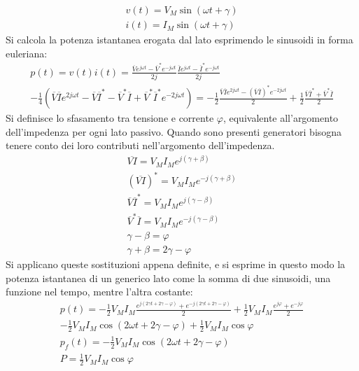 \documentclass{article}
\numberwithin{equation}{subsection}
\begin{document}
\begin{gather*}
    v(t)=V_M\sin(\omega t+\gamma)\\
    i(t)=I_M\sin(\omega t+\gamma)
\end{gather*}
Si calcola la potenza istantanea erogata dal lato esprimendo le sinusoidi in forma euleriana:
\begin{gather*}
    p(t)=v(t)i(t)=\displaystyle\frac{\overline{V}e^{j\omega t}-\overline{V}^*e^{-j\omega t}}{2j}\frac{\overline{I}e^{j\omega t}-\overline{I}^*e^{-j\omega t}}{2j}\\
    \displaystyle-\frac{1}{4}\left(\overline{V}\overline{I}e^{2j\omega t}-\overline{V}\overline{I}^*-\overline{V}^*\overline{I}+\overline{V}^*\overline{I}^*e^{-2j\omega t}\right)
    =-\frac{1}{2}\frac{\overline{V}\overline{I}e^{2j\omega t}-(\overline{V}\overline{I})^*e^{-2j\omega t}}{2}+\frac{1}{2}\frac{\overline{V}\overline{I}^*+\overline{V}^*\overline{I}}{2}
\end{gather*}
Si definisce lo sfasamento tra tensione e corrente $\varphi$, equivalente all'argomento dell'impedenza per ogni lato passivo. Quando sono presenti 
generatori bisogna tenere conto dei loro contributi nell'argomento dell'impedenza. 
\begin{gather*}
    \overline{VI}=V_MI_Me^{j(\gamma+\beta)}\\
     (\overline{VI})^*=V_MI_Me^{-j(\gamma+\beta)}\\
    \overline{V}\overline{I}^*=V_MI_Me^{j(\gamma-\beta)}\\
    \overline{V}^*\overline{I}=V_MI_Me^{-j(\gamma-\beta)}\\
    \gamma-\beta=\varphi\\
    \gamma+\beta=2\gamma-\varphi
\end{gather*}
Si applicano queste sostituzioni appena definite, e si esprime in questo modo la potenza istantanea di un generico lato come la somma di due sinusoidi, una funzione nel tempo, 
mentre l'altra costante:
\begin{gather*}
    p(t)=\displaystyle-\frac{1}{2}V_MI_M\frac{e^{j(2\gamma t+2\gamma-\varphi)}+e^{-j(2\gamma t+2\gamma-\varphi)}}{2}+\frac{1}{2}V_MI_M\frac{e^{j\varphi}+e^{-j\varphi}}{2}\\
    -\displaystyle\frac{1}{2}V_MI_M\cos(2\omega t+2\gamma-\varphi)+\frac{1}{2}V_MI_M\cos\varphi\\
    p_f(t)=-\displaystyle\frac{1}{2}V_MI_M\cos(2\omega t+2\gamma-\varphi)\\
    P=\displaystyle\frac{1}{2}V_MI_M\cos\varphi
\end{gather*}
\end{document}
